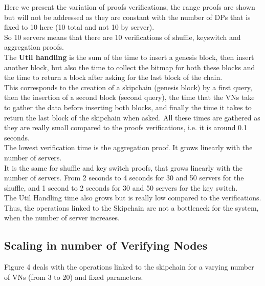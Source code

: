 \documentclass{article}
\begin{document}
Here we present the variation of proofs verifications, the range proofs are shown but will not be addressed as they are constant with the number of DPs that is fixed to 10 here (10 total and not 10 by server).\\
So 10 servers means that there are 10 verifications of shuffle, keyswitch and aggregation proofs.\\
The \textbf{Util handling} is the sum of the time to insert a genesis block, then insert another block, but also the time to collect the bitmap for both these blocks and the time to return a block after asking for the last block of the chain.\\
This corresponds to the creation of a skipchain (genesis block) by a first query, then the insertion of a second block (second query), the time that the VNs take to gather the data before inserting both blocks, and finally the time it takes to return the last block of the skipchain when asked. All these times are gathered as they are really small compared to the proofs verifications, i.e. it is around 0.1 seconds.\\
The lowest verification time is the aggregation proof. It grows linearly with the number of servers.\\
It is the same for shuffle and key switch proofs, that grows linearly with the number of servers. From 2 seconds to 4 seconds for 30 and 50 servers for the shuffle, and 1 second to 2 seconds for 30 and 50 servers for the key switch.\\
The Util Handling time also grows but is really low compared to the verifications. Thus, the operations linked to the Skipchain are not a bottleneck for the system, when the number of server increases.

\subsection{Scaling in number of Verifying Nodes}
Figure 4 deals with the operations linked to the skipchain for a varying number of VNs (from 3 to 20) and fixed parameters.
\end{document}

